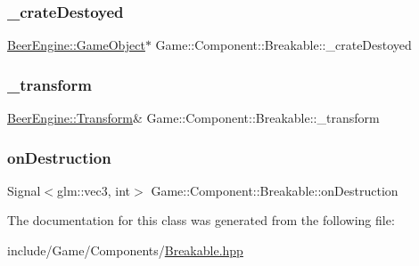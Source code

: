 \subsubsection{\texorpdfstring{\+\_\+crate\+Destoyed}{\_crateDestoyed}}
{\footnotesize\ttfamily \mbox{\hyperlink{class_beer_engine_1_1_game_object}{Beer\+Engine\+::\+Game\+Object}}$\ast$ Game\+::\+Component\+::\+Breakable\+::\+\_\+crate\+Destoyed}

\mbox{\label{class_game_1_1_component_1_1_breakable_a97c7499afa143aa9493c206adcb5eee0}} 
\subsubsection{\texorpdfstring{\+\_\+transform}{\_transform}}
{\footnotesize\ttfamily \mbox{\hyperlink{class_beer_engine_1_1_transform}{Beer\+Engine\+::\+Transform}}\& Game\+::\+Component\+::\+Breakable\+::\+\_\+transform\hspace{0.3cm}{\ttfamily [protected]}}

\mbox{\label{class_game_1_1_component_1_1_breakable_ac0ae61567c2ac3615929e42bdb0ed735}} 
\subsubsection{\texorpdfstring{on\+Destruction}{onDestruction}}
{\footnotesize\ttfamily Signal$<$glm\+::vec3, int$>$ Game\+::\+Component\+::\+Breakable\+::on\+Destruction}



The documentation for this class was generated from the following file\+:\begin{DoxyCompactItemize}
\item 
include/\+Game/\+Components/\mbox{\hyperlink{_breakable_8hpp}{Breakable.\+hpp}}\end{DoxyCompactItemize}
